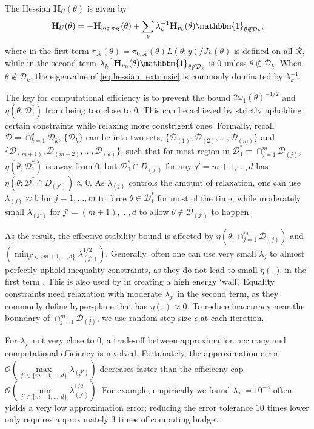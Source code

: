 \documentclass[10pt]{article}
\newcommand{\mc}[1]{\mathcal{#1}}
\DeclareMathOperator{\1}{\mathbbm{1}}
\newcommand{\hess}{\mathbf{H}} %
\begin{document}
The Hessian $\hess_U(\theta)$ is given by
\begin{equation}
\label{eq:hessian_extrinsic}
\hess_U(\theta) = -\hess_{\log \pi_\mc R}(\theta)+\sum_k \lambda_k^{-1} \hess_{v_k}(\theta) \mathbbm{1}_{\theta\not\in \mc D_k},
\end{equation}
where in the first term $\pi_\mc R(\theta)=\pi_{0,\mc R}(\theta)L(\theta;y)/Jv(\theta)$ is defined on all $\mc R$, while in the second term $\lambda_k^{-1} \hess_{v_k}(\theta) \mathbbm{1}_{\theta\not\in \mc D_k}$ is $0$ unless $\theta\not\in \mc D_k$.  When $\theta\not\in \mc D_k$, the eigenvalue of \eqref{eq:hessian_extrinsic} is commonly dominated by $\lambda^{-1}_k$.

The key for computational efficiency is to prevent the bound $2\omega_1(\theta)^{-1/2}$ and $\eta(\theta, {\mc D^*_1})$ from being too close to $0$. This can be achieved by strictly upholding certain constraints while relaxing more constrigent ones. Formally, recall $\mc D=\cap_{k=1}^d \mc D_k$, $\{\mc D_k\}$ can be into two sets, $\{\mc D_{(1)}, \mc D_{(2)}, \ldots , \mc D_{(m)} \}$ and $\{\mc D_{(m+1)}, \mc D_{(m+2)}, \ldots , \mc D_{(d)} \}$, such that  for most region in $\mc D^*_1= \cap_{j=1}^m \mc D_{(j)}$, $\eta(\theta;{\mc D^*_1})$ is away from $0$, but $\mc D^*_1 \cap D_{(j')}$ for any $j'= m+1, \ldots, d$ has $\eta(\theta; \mc D^*_1 \cap D_{(j')})\approx 0$. As $\lambda_{(j)}$ controls the amount of relaxation, one can use $\lambda_{(j)}\approx 0$ for $j=1,\ldots,m$ to force $\theta \in \mc D_1^*$ for most of the time, while moderately small $\lambda_{(j')}$ for $j'=(m+1),\ldots,d$ to allow $\theta\not \in \mc D_{(j')}$ to happen.

As the result, the effective stability bound is affected by 
$\eta(\theta;{\cap_{j=1}^m \mc D_{(j)}})$ and $\left(\min_{j'\in \{m+1,\ldots,d\}}\lambda_{(j')}^{1/2}\right)$. Generally, often one can use very small $\lambda_j$ to almost perfectly uphold inequality constraints, as they do not lead to small $\eta(.)$ in the first term
. This is also used by \cite{neal2011mcmc} in creating a high energy `wall'. Equality constraints need relaxation with moderate $\lambda_{j'}$ in the second term, as they commonly define hyper-plane that has $\eta(.)\approx 0$. To reduce inaccuracy near the boundary of $\cap_{j=1}^m \mc D_{(j)}$, we use random step size $\epsilon$ at each iteration.

For $\lambda_{j'}$ not very close to $0$, a trade-off between approximation accuracy and computational efficiency is involved. Fortunately,  the approximation error $\mc O( \underset{j'\in \{m+1,\ldots,d\}} \max\lambda_{(j')})$ decreases faster than the efficiceny cap $\mc O( \underset{j'\in \{m+1,\ldots,d\}} \min\lambda^{1/2}_{(j')})$. For example, empirically we found $\lambda_{j'}=10^{-4}$ often yields a very low approximation error; reducing the error tolerance $10$ times 
lower only requires approximately $3$ times of computing budget.
\end{document}
